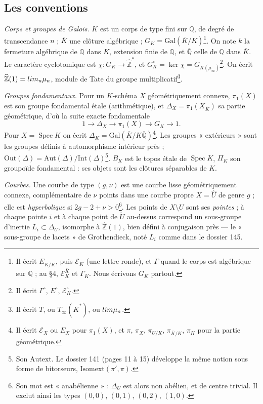 \documentclass[11pt,a4paper]{article}
\begin{document}
\subsection*{Les conventions}

\emph{Corps et groupes de Galois.} $K$ est un corps de type fini sur
$\mathbb{Q}$, de degré de transcendance $n$ ; $\overline{K}$ une clôture
algébrique ; $G_K = \mathrm{Gal}(\overline{K}/K)$\footnote{Il écrit
$E_{\overline{K}/K}$, puis $\mathcal{E}_K$ (une lettre ronde), et $\Gamma$
quand le corps est algébrique sur $\mathbb{Q}$ ; au §4, $\mathcal{E}^{\overline
K}_K$ et $\Gamma_K$. Nous écrivons $G_K$ partout.}. On note $k$ la fermeture
algébrique de $\mathbb{Q}$ dans $K$, extension finie de $\mathbb{Q}$, et
$\overline{\mathbb{Q}}$ celle de $\mathbb{Q}$ dans $\overline{K}$. Le
caractère cyclotomique est $\chi : G_K \to \widehat{\mathbb{Z}}^{*}$, et
$G_K^{\circ} = \ker \chi = G_{K(\mu_\infty)}$\footnote{Il écrit
$\Gamma^{\circ}$, $E^{\circ}$, $\mathcal{E}_K^{\circ}$.}. On écrit
$\widehat{\mathbb{Z}}(1) = \varprojlim_n \mu_n$, module de Tate du groupe
multiplicatif\footnote{Il écrit $T$, ou $T_\infty(\overline{K}^{*})$, ou
$\varprojlim \mu_n$.}.

\emph{Groupes fondamentaux.} Pour un $K$-schéma $X$ géométriquement connexe,
$\pi_1(X)$ est son groupe fondamental étale (arithmétique), et
$\Delta_X = \pi_1(X_{\overline{K}})$ sa partie géométrique, d'où la suite
exacte fondamentale
\[
1 \longrightarrow \Delta_X \longrightarrow \pi_1(X) \longrightarrow G_K
\longrightarrow 1 .
\]
Pour $X = \operatorname{Spec} K$ on écrit $\Delta_K = \mathrm{Gal}(\overline{K}
/ K\overline{\mathbb{Q}})$\footnote{Il écrit $\mathcal{E}_X$ ou $E_X$ pour
$\pi_1(X)$, et $\pi$, $\pi_X$, $\pi_{U/K}$, $\pi_{\overline{K}/K}$, $\pi_K$
pour la partie géométrique.}. Les groupes « extérieurs » sont les groupes
définis à automorphisme intérieur près ; $\mathrm{Out}(\Delta) =
\mathrm{Aut}(\Delta)/\mathrm{Int}(\Delta)$\footnote{Son $\mathrm{Autext}$. Le
dossier 141 (pages 11 à 15) développe la même notion sous forme de
bitorseurs, $\mathrm{Isomext}(\pi', \pi)$.}. $B_K$ est le topos étale de
$\operatorname{Spec} K$, $\Pi_K$ son groupoïde fondamental : ses objets sont
les clôtures séparables de $K$.

\emph{Courbes.} Une courbe de type $(g, \nu)$ est une courbe lisse
géométriquement connexe, complémentaire de $\nu$ points dans une courbe
propre $X = \widehat{U}$ de genre $g$ ; elle est \emph{hyperbolique} si
$2g - 2 + \nu > 0$\footnote{Son mot est « anabélienne » : $\Delta_U$ est
alors non abélien, et de centre trivial. Il exclut ainsi les types $(0,0)$,
$(0,1)$, $(0,2)$, $(1,0)$.}. Les points de $X \setminus U$ sont ses
\emph{pointes} ; à chaque pointe $i$ et à chaque point de
$\widetilde{U}$ au-dessus correspond un sous-groupe d'inertie $L_i \subset
\Delta_U$, isomorphe à $\widehat{\mathbb{Z}}(1)$, bien défini à conjugaison
près — le « sous-groupe de lacets » de Grothendieck, noté $L_i$ comme dans
le dossier 145.
\end{document}
